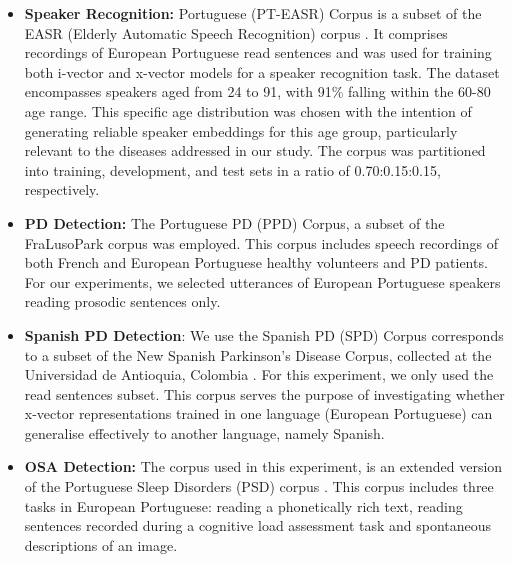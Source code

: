 \begin{itemize}
  \item \textbf{Speaker Recognition:} Portuguese (PT-EASR) Corpus is a subset of the EASR (Elderly Automatic Speech Recognition) corpus \cite{hamalainen2014easr}. It comprises recordings of European Portuguese read sentences and was used for training both i-vector and x-vector models for a speaker recognition task. The dataset encompasses speakers aged from 24 to 91, with 91\% falling within the 60-80 age range. This specific age distribution was chosen with the intention of generating reliable speaker embeddings for this age group, particularly relevant to the diseases addressed in our study. The corpus was partitioned into training, development, and test sets in a ratio of 0.70:0.15:0.15, respectively.

  \item \textbf{\ac{PD} Detection:} The Portuguese \ac{PD} (PPD) Corpus, a subset of the FraLusoPark corpus \cite{pinto2016dysarthria} was employed. This corpus includes speech recordings of both French and European Portuguese healthy volunteers and \ac{PD} patients. For our experiments, we selected utterances of European Portuguese speakers reading prosodic sentences only.

  \item \textbf{Spanish \ac{PD} Detection}: We use the Spanish \ac{PD} (SPD) Corpus corresponds to a subset of the New Spanish Parkinson’s Disease Corpus, collected at the Universidad de Antioquia, Colombia \cite{orozco2014new}. For this experiment, we only used the read sentences subset. This corpus serves the purpose of investigating whether x-vector representations trained in one language (European Portuguese) can generalise effectively to another language, namely Spanish.
  
  \item \textbf{ \ac{OSA} Detection:} The corpus used in this experiment, is an extended version of the Portuguese Sleep Disorders (PSD) corpus \cite{botelho2019speech}. This corpus includes three tasks in European Portuguese: reading a phonetically rich text, reading sentences recorded during a cognitive load assessment task and spontaneous descriptions of an image. 
\end{itemize}


